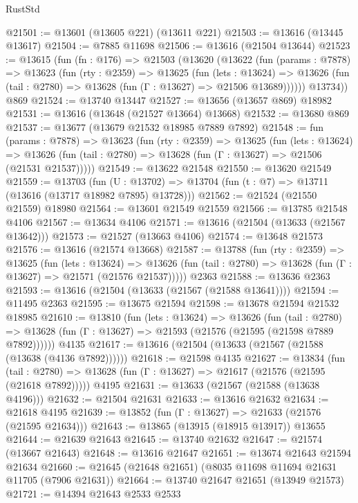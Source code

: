 \begin{lexlean}{RustStd}
\begin{coremodule}
@21501 := @13601 (@13605 @221) (@13611 @221)
@21503 := @13616 (@13445 @13617)
@21504 := @7885 @11698
@21506 := @13616 (@21504 @13644)
@21523 := @13615
    (fun (fn : @176) =>
    @21503
      (@13620
        (@13622
          (fun (params : @7878) =>
          @13623
            (fun (rty : @2359) =>
            @13625
              (fun (lets : @13624) =>
              @13626 (fun (tail : @2780) => @13628 (fun (Γ : @13627) => @21506 @13689))))))
        @13734))
    @869
@21524 := @13740 @13447
@21527 := @13656 (@13657 @869) @18982
@21531 := @13616 (@13648 (@21527 @13664) @13668)
@21532 := @13680 @869
@21537 := @13677 (@13679 @21532 @18985 @7889 @7892)
@21548 := fun (params : @7878) =>
  @13623
    (fun (rty : @2359) =>
    @13625
      (fun (lets : @13624) =>
      @13626 (fun (tail : @2780) => @13628 (fun (Γ : @13627) => @21506 (@21531 @21537)))))
@21549 := @13622 @21548
@21550 := @13620 @21549
@21559 := @13703
    (fun (U : @13702) => @13704 (fun (t : @7) => @13711 (@13616 (@13717 @18982 @7895) @13728)))
@21562 := @21524 (@21550 @21559) @18980
@21564 := @13601 @21549 @21559
@21566 := @13785 @21548 @4106
@21567 := @13634 @4106
@21571 := @13616 (@21504 (@13633 (@21567 @13642)))
@21573 := @21527 (@13663 @4106)
@21574 := @13648 @21573
@21576 := @13616 (@21574 @13668)
@21587 := @13788
    (fun (rty : @2359) =>
    @13625
      (fun (lets : @13624) =>
      @13626 (fun (tail : @2780) => @13628 (fun (Γ : @13627) => @21571 (@21576 @21537)))))
    @2363
@21588 := @13636 @2363
@21593 := @13616 (@21504 (@13633 (@21567 (@21588 @13641))))
@21594 := @11495 @2363
@21595 := @13675 @21594
@21598 := @13678 @21594 @21532 @18985
@21610 := @13810
    (fun (lets : @13624) =>
    @13626
      (fun (tail : @2780) =>
      @13628 (fun (Γ : @13627) => @21593 (@21576 (@21595 (@21598 @7889 @7892))))))
    @4135
@21617 := @13616 (@21504 (@13633 (@21567 (@21588 (@13638 (@4136 @7892))))))
@21618 := @21598 @4135
@21627 := @13834
    (fun (tail : @2780) => @13628 (fun (Γ : @13627) => @21617 (@21576 (@21595 (@21618 @7892)))))
    @4195
@21631 := @13633 (@21567 (@21588 (@13638 @4196)))
@21632 := @21504 @21631
@21633 := @13616 @21632
@21634 := @21618 @4195
@21639 := @13852 (fun (Γ : @13627) => @21633 (@21576 (@21595 @21634)))
@21643 := @13865 (@13915 (@18915 @13917)) @13655
@21644 := @21639 @21643
@21645 := @13740 @21632
@21647 := @21574 (@13667 @21643)
@21648 := @13616 @21647
@21651 := @13674 @21643 @21594 @21634
@21660 := @21645 (@21648 @21651) (@8035 @11698 @11694 @21631 @11705 (@7906 @21631))
@21664 := @13740 @21647 @21651 (@13949 @21573)
@21721 := @14394
    @21643
    @2533
    @2533

\end{coremodule}
\end{lexlean}
